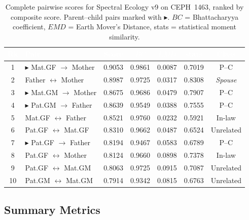 \documentclass{../yalumba}
\begin{document}
\begin{table}[H]
  \centering
  \tablestyle
  \caption{Complete pairwise scores for Spectral Ecology v9 on CEPH~1463,
    ranked by composite score.  Parent--child pairs marked with
    $\blacktriangleright$.  $BC$ = Bhattacharyya coefficient, $EMD$ = Earth
    Mover's Distance, stats = statistical moment similarity.}
  \label{tab:scores}
  \begin{tabular}{clccccc}
    \toprule
    \rowcolor{table-header}
    \textcolor{white}{\textbf{Rk}} &
    \textcolor{white}{\textbf{Pair}} &
    \textcolor{white}{\textbf{Score}} &
    \textcolor{white}{\textbf{$BC$}} &
    \textcolor{white}{\textbf{$EMD$}} &
    \textcolor{white}{\textbf{stats}} &
    \textcolor{white}{\textbf{Class}} \\
    \midrule
    1 & $\blacktriangleright$ Mat.GF $\to$ Mother
      & 0.9053 & 0.9861 & 0.0087 & 0.7019 & P--C \\
    2 & Father $\leftrightarrow$ Mother
      & 0.8987 & 0.9725 & 0.0317 & 0.8308 & \textit{Spouse} \\
    3 & $\blacktriangleright$ Mat.GM $\to$ Mother
      & 0.8675 & 0.9686 & 0.0479 & 0.7907 & P--C \\
    4 & $\blacktriangleright$ Pat.GM $\to$ Father
      & 0.8639 & 0.9549 & 0.0388 & 0.7555 & P--C \\
    5 & Mat.GF $\leftrightarrow$ Father
      & 0.8521 & 0.9760 & 0.0232 & 0.5921 & In-law \\
    6 & Pat.GF $\leftrightarrow$ Mat.GF
      & 0.8310 & 0.9662 & 0.0487 & 0.6524 & Unrelated \\
    7 & $\blacktriangleright$ Pat.GF $\to$ Father
      & 0.8194 & 0.9467 & 0.0583 & 0.6789 & P--C \\
    8 & Pat.GF $\leftrightarrow$ Mother
      & 0.8124 & 0.9660 & 0.0898 & 0.7378 & In-law \\
    9 & Pat.GF $\leftrightarrow$ Mat.GM
      & 0.8063 & 0.9725 & 0.0915 & 0.7087 & Unrelated \\
    10 & Pat.GM $\leftrightarrow$ Mat.GM
       & 0.7914 & 0.9342 & 0.0815 & 0.6763 & Unrelated \\
    \bottomrule
  \end{tabular}
\end{table}

\subsection{Summary Metrics}
\end{document}
